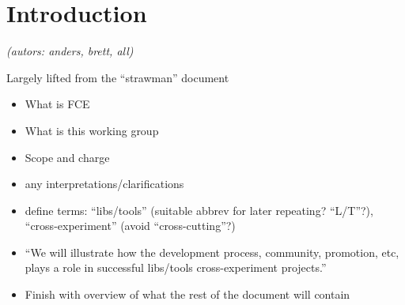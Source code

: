 \section{Introduction}

\textit{(autors: anders, brett, all)}

Largely lifted from the ``strawman'' document
\begin{itemize}
\item What is FCE
\item What is this working group
\item Scope and charge
\item any interpretations/clarifications
\item define terms: ``libs/tools'' (suitable abbrev for later repeating? ``L/T''?), ``cross-experiment'' (avoid ``cross-cutting''?)
\item ``We will illustrate how the development process, community, promotion, etc, plays a role in successful libs/tools cross-experiment projects.''
\item Finish with overview of what the rest of the document will contain
\end{itemize}

